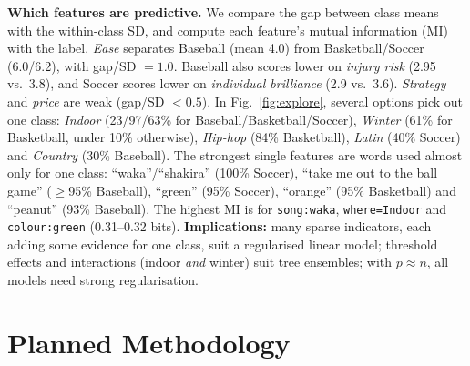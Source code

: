 \documentclass[12pt]{article}
\begin{document}
\textbf{Which features are predictive.} We compare the gap between class means with the within-class SD, and compute each feature's mutual information (MI) with the label. \emph{Ease} separates Baseball (mean 4.0) from Basketball/Soccer (6.0/6.2), with gap/SD $=1.0$. Baseball also scores lower on \emph{injury risk} (2.95 vs.\ 3.8), and Soccer scores lower on \emph{individual brilliance} (2.9 vs.\ 3.6). \emph{Strategy} and \emph{price} are weak (gap/SD $<0.5$). In Fig.~\ref{fig:explore}, several options pick out one class: \emph{Indoor} (23/97/63\% for Baseball/Basketball/Soccer), \emph{Winter} (61\% for Basketball, under 10\% otherwise), \emph{Hip-hop} (84\% Basketball), \emph{Latin} (40\% Soccer) and \emph{Country} (30\% Baseball). The strongest single features are words used almost only for one class: ``waka''/``shakira'' (100\% Soccer), ``take me out to the ball game'' ($\ge$95\% Baseball), ``green'' (95\% Soccer), ``orange'' (95\% Basketball) and ``peanut'' (93\% Baseball). The highest MI is for \texttt{song:waka}, \texttt{where=Indoor} and \texttt{colour:green} (0.31--0.32 bits). \textbf{Implications:} many sparse indicators, each adding some evidence for one class, suit a regularised linear model; threshold effects and interactions (indoor \emph{and} winter) suit tree ensembles; with $p\approx n$, all models need strong regularisation.

\section{Planned Methodology}\label{sec:methodology}
\end{document}
